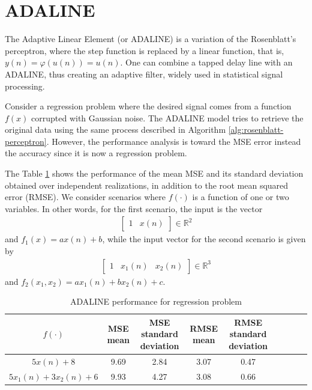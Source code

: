 \documentclass[12pt,a4paper]{article}
\newcommand{\Real}{\mathbb{R}}
\begin{document}
\section{ADALINE}

The Adaptive Linear Element (or ADALINE) is a variation of the Rosenblatt's perceptron, where the step function is replaced by a linear function, that is, \(y(n) = \varphi(u(n)) = u(n)\). One can combine a tapped delay line with an ADALINE, thus creating an adaptive filter, widely used in statistical signal processing.

Consider a regression problem where the desired signal comes from a function \(f(x)\) corrupted with Gaussian noise. The ADALINE model tries to retrieve the original data using the same process described in Algorithm \ref{alg:rosenblatt-perceptron}. However, the performance analysis is toward the MSE error instead the accuracy since it is now a regression problem.

The Table \ref{tab:adaline-results} shows the performance of the mean MSE and its standard deviation obtained over independent realizations, in addition to the root mean squared error (RMSE). We consider scenarios where \(f(\cdot)\) is a function of one or two variables. In other words, for the first scenario, the input is the vector
\begin{align}
    \begin{bmatrix}
        1 & x(n)
    \end{bmatrix} \in \Real^2
\end{align}
and \(f_1(x) = ax(n)+b\), while the input vector for the second scenario is given by
\begin{align}
    \begin{bmatrix}
        1 & x_1(n) & x_2(n)
    \end{bmatrix} \in \Real^3
\end{align}
and \(f_2(x_1, x_2) = ax_1(n)+bx_2(n)+c\).

\begin{table}[H]
	\centering
	\caption{ADALINE performance for regression problem}
	\footnotesize
	\setlength{\tabcolsep}{5pt}
	\begin{tabular}{ccccccccc}
		\hline
		\(f(\cdot)\) & MSE mean & MSE standard deviation & RMSE mean & RMSE standard deviation \\
		\hline
		\(5x(n)+8\) & 9.69 & 2.84 & 3.07 & 0.47 \\
        \hline
		\(5x_1(n)+3x_2(n)+6\) & 9.93 & 4.27 & 3.08 & 0.66 \\
		\hline
	\end{tabular} \label{tab:adaline-results}
\end{table}
\end{document}
